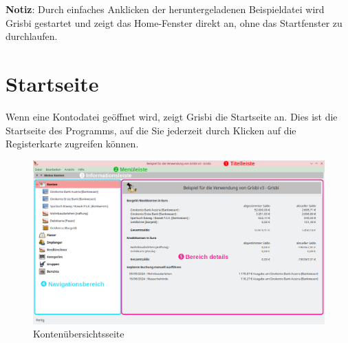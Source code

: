 
\textbf{Notiz}: Durch einfaches Anklicken der heruntergeladenen Beispieldatei wird Grisbi gestartet und zeigt das Home-Fenster direkt an, ohne das Startfenster zu durchlaufen.%

\section{Startseite\label{home}}%


Wenn eine Kontodatei geöffnet wird, zeigt Grisbi die Startseite an.%
Dies ist die Startseite des Programms, auf die Sie jederzeit durch Klicken auf die Registerkarte  zugreifen können.%


\begin{figure}[htbp]			%
	\begin{center}
		\includegraphics[width=1\textwidth]{image/screenshot/home_3.0.png}
	\end{center}
	\caption{Kontenübersichtsseite}		%
	\label{home_3.0}
\end{figure}



